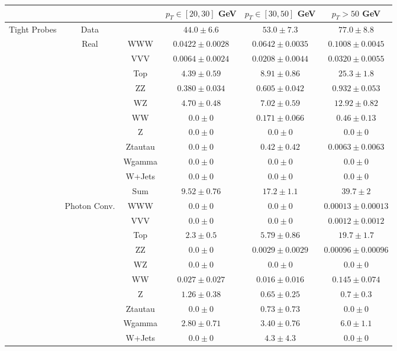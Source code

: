 \small
\begin{tabular}{|c|cc||c|c|c|}
\hline
\multicolumn{3}{|c||}{} & $p_{T}\in[20,30]$ GeV & $p_{T}\in[30,50]$ GeV & $p_{T} > 50$ GeV\\ 
\hline
\hline
\multirow{23}{*}{Tight Probes} & Data & &  $44.0 \pm 6.6$ &  $53.0 \pm 7.3$ &  $77.0 \pm 8.8$\\ 
\cline{2-6}
&\multirow{11}{*}{Real} &WWW &  $0.0422 \pm 0.0028$ &  $0.0642 \pm 0.0035$ &  $0.1008 \pm 0.0045$\\ 
&& VVV &  $0.0064 \pm 0.0024$ &  $0.0208 \pm 0.0044$ &  $0.0320 \pm 0.0055$\\ 
&& Top &  $4.39 \pm 0.59$ &  $8.91 \pm 0.86$ &  $25.3 \pm 1.8$\\ 
&& ZZ &  $0.380 \pm 0.034$ &  $0.605 \pm 0.042$ &  $0.932 \pm 0.053$\\ 
&& WZ &  $4.70 \pm 0.48$ &  $7.02 \pm 0.59$ &  $12.92 \pm 0.82$\\ 
&& WW &  $0.0 \pm 0$ &  $0.171 \pm 0.066$ &  $0.46 \pm 0.13$\\ 
&& Z &  $0.0 \pm 0$ &  $0.0 \pm 0$ &  $0.0 \pm 0$\\ 
&& Ztautau &  $0.0 \pm 0$ &  $0.42 \pm 0.42$ &  $0.0063 \pm 0.0063$\\ 
&& Wgamma &  $0.0 \pm 0$ &  $0.0 \pm 0$ &  $0.0 \pm 0$\\ 
&& W+Jets &  $0.0 \pm 0$ &  $0.0 \pm 0$ &  $0.0 \pm 0$\\ 
\cline{3-6}
&& Sum &  $9.52 \pm 0.76$ &  $17.2 \pm 1.1$ &  $39.7 \pm 2$\\ 
\cline{2-6}
\cline{2-6}
&\multirow{11}{*}{Photon Conv.}& WWW &  $0.0 \pm 0$ &  $0.0 \pm 0$ &  $0.00013 \pm 0.00013$\\ 
&& VVV &  $0.0 \pm 0$ &  $0.0 \pm 0$ &  $0.0012 \pm 0.0012$\\ 
&& Top &  $2.3 \pm 0.5$ &  $5.79 \pm 0.86$ &  $19.7 \pm 1.7$\\ 
&& ZZ &  $0.0 \pm 0$ &  $0.0029 \pm 0.0029$ &  $0.00096 \pm 0.00096$\\ 
&& WZ &  $0.0 \pm 0$ &  $0.0 \pm 0$ &  $0.0 \pm 0$\\ 
&& WW &  $0.027 \pm 0.027$ &  $0.016 \pm 0.016$ &  $0.145 \pm 0.074$\\ 
&& Z &  $1.26 \pm 0.38$ &  $0.65 \pm 0.25$ &  $0.7 \pm 0.3$\\ 
&& Ztautau &  $0.0 \pm 0$ &  $0.73 \pm 0.73$ &  $0.0 \pm 0$\\ 
&& Wgamma &  $2.80 \pm 0.71$ &  $3.40 \pm 0.76$ &  $6.0 \pm 1.1$\\ 
&& W+Jets &  $0.0 \pm 0$ &  $4.3 \pm 4.3$ &  $0.0 \pm 0$\\ 

\end{tabular}
